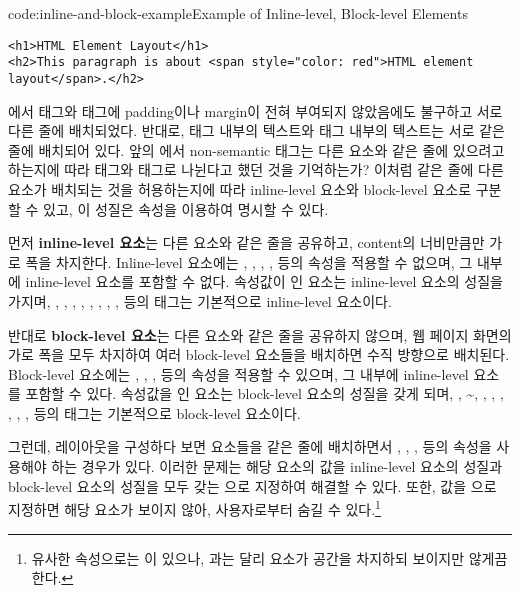 \begin{codeenv}{code:inline-and-block-example}{Example of Inline-level, Block-level Elements}\begin{verbatim}
<h1>HTML Element Layout</h1>
<h2>This paragraph is about <span style="color: red">HTML element layout</span>.</h2>
\end{verbatim}
\end{codeenv}

에서  태그와  태그에 padding이나 margin이 전혀 부여되지 않았음에도 불구하고 서로 다른 줄에 배치되었다. 반대로,  태그 내부의 텍스트와  태그 내부의 텍스트는 서로 같은 줄에 배치되어 있다. 앞의 에서 non-semantic 태그는 다른 요소와 같은 줄에 있으려고 하는지에 따라  태그와  태그로 나뉜다고 했던 것을 기억하는가? 이처럼 같은 줄에 다른 요소가 배치되는 것을 허용하는지에 따라 inline-level 요소와 block-level 요소로 구분할 수 있고, 이 성질은  속성을 이용하여 명시할 수 있다.

먼저 \textbf{inline-level 요소}는 다른 요소와 같은 줄을 공유하고, content의 너비만큼만 가로 폭을 차지한다. Inline-level 요소에는 , , , ,  등의 속성을 적용할 수 없으며, 그 내부에 inline-level 요소를 포함할 수 없다.  속성값이 인 요소는 inline-level 요소의 성질을 가지며, , , , , , , , ,  등의 태그는 기본적으로 inline-level 요소이다.

반대로 \textbf{block-level 요소}는 다른 요소와 같은 줄을 공유하지 않으며, 웹 페이지 화면의 가로 폭을 모두 차지하여 여러 block-level 요소들을 배치하면 수직 방향으로 배치된다. Block-level 요소에는 , , ,  등의 속성을 적용할 수 있으며, 그 내부에 inline-level 요소를 포함할 수 있다.  속성값을 인 요소는 block-level 요소의 성질을 갖게 되며, , \textasciitilde{}, , , , , , ,  등의 태그는 기본적으로 block-level 요소이다.

그런데, 레이아웃을 구성하다 보면 요소들을 같은 줄에 배치하면서 , , ,  등의 속성을 사용해야 하는 경우가 있다. 이러한 문제는 해당 요소의  값을 inline-level 요소의 성질과 block-level 요소의 성질을 모두 갖는 으로 지정하여 해결할 수 있다. 또한,  값을 으로 지정하면 해당 요소가 보이지 않아, 사용자로부터 숨길 수 있다.\footnote{유사한 속성으로는 이 있으나, 과는 달리 요소가 공간을 차지하되 보이지만 않게끔 한다.}

